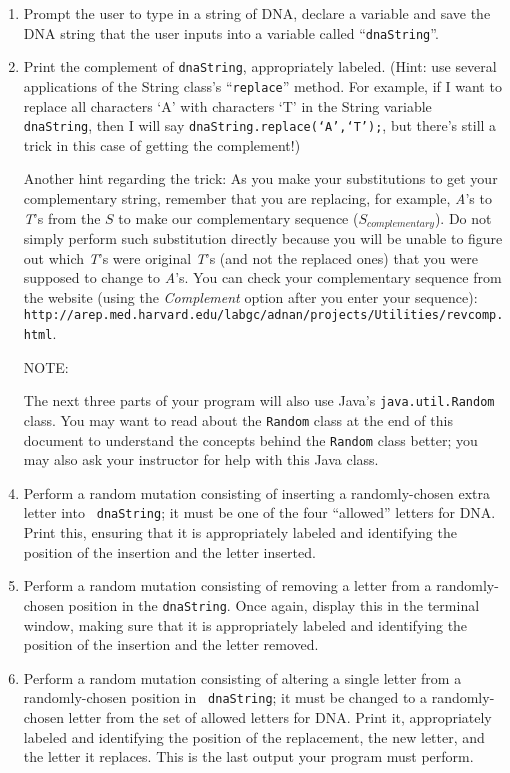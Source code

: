 \documentclass[11pt]{article}
\newcommand{\url}[1]{\lstinline{#1}}
\begin{document}
\begin{enumerate}

\item Prompt the user to type in a string of DNA, declare a variable and save the DNA string that the user inputs into a
  variable called ``{\tt dnaString}''.

\item Print the complement of {\tt dnaString}, appropriately labeled.  (Hint: use several applications of the String
  class's ``{\tt replace}'' method. For example, if I want to replace all characters `A' with characters `T' in the
  String variable {\tt dnaString}, then I will say {\tt dnaString.replace(`A',`T');}, but there's still a trick in this
  case of getting the complement!)

Another hint regarding the trick: As you make your substitutions to get your complementary string, remember that you are
replacing, for example, \emph{A}'s to \emph{T}'s from the $S$ to make our complementary sequence ($S_{complementary}$).
Do not simply perform such substitution directly because you will be unable to figure out which \emph{T}'s were original
\emph{T}'s (and not the replaced ones) that you were supposed to change to \emph{A}'s. You can check your complementary
sequence from the website  (using the \emph{Complement} option after you enter your sequence): \url{http://arep.med.harvard.edu/labgc/adnan/projects/Utilities/revcomp.html}.

\item[NOTE:]

The next three parts of your program will also use Java's {\tt java.util.Random} class. You may want to read about the
{\tt Random} class at the end of this document to understand the concepts behind the {\tt Random} class better; you may
also ask your instructor for help with this Java class.

\item \begin{sloppypar} Perform a random mutation consisting of inserting a randomly-chosen extra letter into {\tt
  dnaString}; it must be one of the four ``allowed'' letters for DNA. Print this, ensuring that it is appropriately
labeled and identifying the position of the insertion and the letter inserted. \end{sloppypar}

\item Perform a random mutation consisting of removing a letter from a randomly-chosen position in the {\tt dnaString}.
  Once again, display this in the terminal window, making sure that it is appropriately labeled and identifying the
  position of the insertion and the letter removed.

\item Perform a random mutation consisting of altering a single letter from a randomly-chosen position in {\tt
  dnaString}; it must be changed to a randomly-chosen letter from the set of allowed letters for DNA. Print it,
  appropriately labeled and identifying the position of the replacement, the new letter, and the letter it replaces.
  This is the last output your program must perform.

\end{enumerate}
\end{document}

